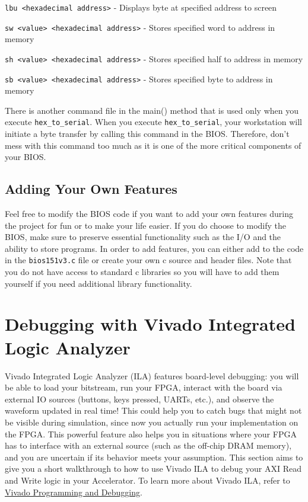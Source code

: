 \documentclass[11pt]{article}
\begin{document}
\verb|lbu <hexadecimal address>| - Displays byte at specified address to screen

\verb|sw <value> <hexadecimal address>| - Stores specified word to address in memory

\verb|sh <value> <hexadecimal address>| - Stores specified half to address in memory

\verb|sb <value> <hexadecimal address>| - Stores specified byte to address in memory

There is another command file in the main() method that is used only when you execute
\verb|hex_to_serial|. When you execute \verb|hex_to_serial|, your workstation will initiate a byte
transfer by calling this command in the BIOS. Therefore, don’t mess with this command too
much as it is one of the more critical components of your BIOS.

\subsection{Adding Your Own Features}
Feel free to modify the BIOS code if you want to add your own features during the project for
fun or to make your life easier. If you do choose to modify the BIOS, make sure to preserve
essential functionality such as the I/O and the ability to store programs. In order to add
features, you can either add to the code in the \verb|bios151v3.c| file or create your own c source and
header files. Note that you do not have access to standard c libraries so you will have to add
them yourself if you need additional library functionality.

\newpage
\section{Debugging with Vivado Integrated Logic Analyzer}
\label{sec:vivado_ila}

Vivado Integrated Logic Analyzer (ILA) features board-level debugging: you will be able to load your bitstream, run your FPGA, interact with the board via external IO sources (buttons, keys pressed, UARTs, etc.), and observe the waveform updated in real time! This could help you to catch bugs that might not be visible during simulation, since now you actually run your implementation on the FPGA. This powerful feature also helps you in situations where your FPGA has to interface with an external source (such as the off-chip DRAM memory), and you are uncertain if its behavior meets your assumption. This section aims to give you a short walkthrough to how to use Vivado ILA to debug your AXI Read and Write logic in your Accelerator. To learn more about Vivado ILA, refer to \href{https://www.xilinx.com/support/documentation/sw_manuals/xilinx2019_2/ug908-vivado-programming-debugging.pdf}{Vivado Programming and Debugging}.
\end{document}
